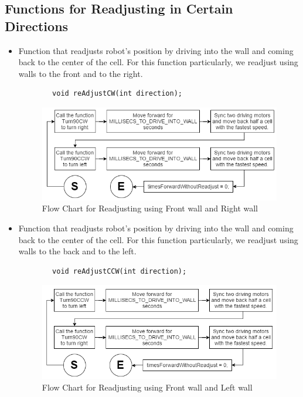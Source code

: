 \documentclass[11pt]{article}
\begin{document}

\subsection{Functions for Readjusting in Certain Directions}
\begin{itemize}
\item Function that readjusts robot's position by driving into the wall and coming back to the center of the cell. For this function particularly, we readjust using walls to the front and to the right.
	\begin{verbatim}
		void reAdjustCW(int direction);
	\end{verbatim}
\begin{figure}[htp]
\centering
\includegraphics[scale=0.52]{images/Software_Flowchart/reAdjustCW.png}
\caption{Flow Chart for Readjusting using Front wall and Right wall}
\label{}
\end{figure}
\item Function that readjusts robot's position by driving into the wall and coming back to the center of the cell. For this function particularly, we readjust using walls to the back and to the left.
	\begin{verbatim}
		void reAdjustCCW(int direction);
	\end{verbatim}
\begin{figure}[htp]
\centering
\includegraphics[scale=0.52]{images/Software_Flowchart/reAdjustCCW.png}
\caption{Flow Chart for Readjusting using Front wall and Left wall}

\end{figure}
\end{itemize}
\end{document}
